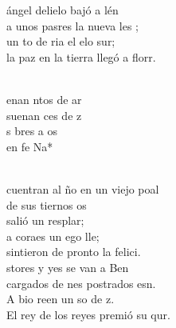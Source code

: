 \documentclass[12pt]{article}
\begin{document}
\begin{multicols*}{2}
\begin{cancion}%
	 ángel delielo bajó a lén\\
	a unos pasres la nueva les ;\\
	un to de ria el elo sur; \\
	la paz en la tierra llegó a florr.\\\jump\\
	\begin{chorus}%
	enan ntos de ar\\
	suenan ces de z\\
	 s bres a os\\
	en fe Na*\\
	\end{chorus}%
	\jump\\
	cuentran al ño en un viejo poal\\
	de sus tiernos os \\
	salió un resplar;\\
	a  coraes un ego lle; \\
	sintieron de pronto la felici.\\
	stores y yes se van a Ben \\
	cargados de nes postrados esn.\\
	A bio reen un so de z.\\
	El rey de los reyes premió su qur.\\
\end{cancion}%


\end{multicols*}
\end{document}
